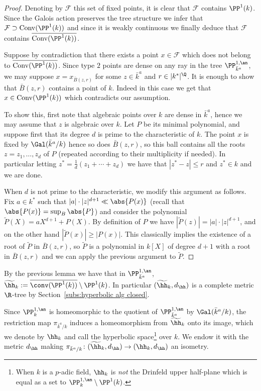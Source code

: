 \begin{proof}
Denoting by $\mathcal{F}$ this set of fixed points, it is clear that $\mathcal{F}$ contains $\PP^1(k)$. Since the Galois action preserves the tree structure we infer that $\mathcal{F}\supset \mathrm{Conv}(\PP^1(k))$ and since it is weakly continuous we finally deduce that $\mathcal{F}$ contains $\overline{\mathrm{Conv}(\PP^1(k))}$.

Suppose by contradiction that there exists a point $x\in \mathcal{F}$ which does not belong to $\overline{\mathrm{Conv}(\PP^1(k))}$. Since type $2$ points are dense on any ray in the tree $\PP^{1,\an}_{\bar{k}^a}$, we may suppose $x =x_{\bar{B}(z,r)}$ for some $z\in \bar{k}^a$ and $r \in |k^*|^{\Q}$. It is enough to show that $\bar{B}(z,r)$ contains a point of $k$. Indeed in this case we get that $x \in\mathrm{Conv}(\PP^1(k))$ which contradicts our assumption.

To show this, first note that algebraic points over $k$ are dense in $\bar{k}^a$, hence we may assume that $z$ is algebraic over $k$. Let $P$ be its minimal polynomial, and suppose first that its degree $d$ is prime to the characteristic of $k$. The point $x$ is fixed by $\Gal(\bar{k}^a/k)$ hence so does $\bar{B}(z,r)$, so this ball contains all the roots $z=z_1, \ldots, z_d$ of $P$ (repeated according to their multiplicity if needed). In particular letting $z^* = \frac1{d} (z_1+ \cdots + z_d)$ we have that $|z^* - z| \le r$ and $z^*\in k$ and we are done.

When $d$ is not prime to the characteristic, we modify this argument as follows. Fix $a\in k^*$ such that $ |a| \cdot |z|^{d+1} \ll \abs{P(x)}$ (recall that $\abs{P(x)} = \sup_B\abs{P}$) and consider the polynomial $\widetilde{P}(X)= a X^{d+1} + P(X)$. By definition of $P$ we have $|\widetilde{P}(z)| = |a| \cdot |z|^{d+1}$, and on the other hand $|\widetilde{P}(x)| \ge |P(x)| $. This classically implies the existence of a root of $\widetilde{P}$ in $\bar{B}(z,r)$, so $\widetilde P$ is a polynomial in $k[X]$ of degree $d+1$ with a root in $\bar{B}(z,r)$ and we can apply the previous argument to $\widetilde P$.
\end{proof}

By the previous lemma we have that in $\PP^{1,\an}_{\bar{k}^a}$, $\widetilde{\hh}_k:= \overline{\conv(\PP^1(k))}\setminus \PP^1(k)$. In particular $(\widetilde{\hh}_{k},d_\hh)$ is a complete metric $\R$-tree by Section~\ref{subs:hyperbolic alg closed}.

Since $\PP^{1,\an}_{k}$ is homeomorphic to the quotient of $\PP^{1,\an}_{\bar{k}^a}$ by $\Gal(\bar{k}^a/k)$, the restriction map $\pi_{\bar{k}^a/k}$ induces a homeomorphism from $\widetilde{\hh}_k$ onto its image, which we denote by $\hh_k$ and call the hyperbolic space\footnote{When $k$ is a $p$-adic field, $\hh_k$ is \emph{not} the Drinfeld upper half-plane which is equal as a set to $\PP^{1,\an}_k \setminus \PP^1(k)$. } over $k$. We endow it with the metric $d_\hh$ making $\pi_{\bar{k}^a/k}\colon (\widetilde{\hh}_k,d_\hh)\to (\hh_k,d_\hh)$ an isometry.

